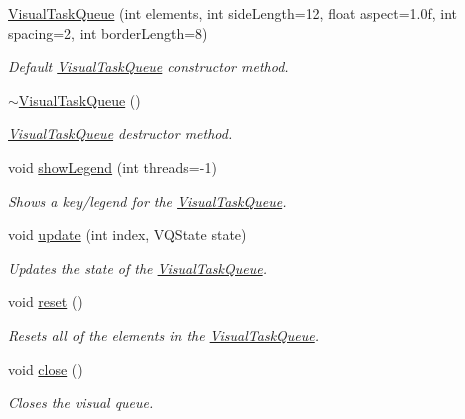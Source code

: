 \begin{DoxyCompactItemize}
\item 
\hyperlink{classtsgl_1_1_visual_task_queue_ad82aabf35ec367b2b0c5894999f5e76e}{\-Visual\-Task\-Queue} (int elements, int side\-Length=12, float aspect=1.\-0f, int spacing=2, int border\-Length=8)
\begin{DoxyCompactList}\small\item\em \-Default \hyperlink{classtsgl_1_1_visual_task_queue}{\-Visual\-Task\-Queue} constructor method. \end{DoxyCompactList}\item 
\hyperlink{classtsgl_1_1_visual_task_queue_ae961a57508ba1d38570d1431c4367a09}{$\sim$\-Visual\-Task\-Queue} ()
\begin{DoxyCompactList}\small\item\em \hyperlink{classtsgl_1_1_visual_task_queue}{\-Visual\-Task\-Queue} destructor method. \end{DoxyCompactList}\item 
void \hyperlink{classtsgl_1_1_visual_task_queue_a7153e63b78fc257f162410c3e55e13dc}{show\-Legend} (int threads=-\/1)
\begin{DoxyCompactList}\small\item\em \-Shows a key/legend for the \hyperlink{classtsgl_1_1_visual_task_queue}{\-Visual\-Task\-Queue}. \end{DoxyCompactList}\item 
void \hyperlink{classtsgl_1_1_visual_task_queue_a2fc5733a57213a6eee116408738851fc}{update} (int index, \-V\-Q\-State state)
\begin{DoxyCompactList}\small\item\em \-Updates the state of the \hyperlink{classtsgl_1_1_visual_task_queue}{\-Visual\-Task\-Queue}. \end{DoxyCompactList}\item 
void \hyperlink{classtsgl_1_1_visual_task_queue_a1cd23a5361c0209ac950db6afcd68a19}{reset} ()
\begin{DoxyCompactList}\small\item\em \-Resets all of the elements in the \hyperlink{classtsgl_1_1_visual_task_queue}{\-Visual\-Task\-Queue}. \end{DoxyCompactList}\item 
void \hyperlink{classtsgl_1_1_visual_task_queue_a7340d211424a9f947152fed22cce4d79}{close} ()
\begin{DoxyCompactList}\small\item\em \-Closes the visual queue. \end{DoxyCompactList}\end{DoxyCompactItemize}


